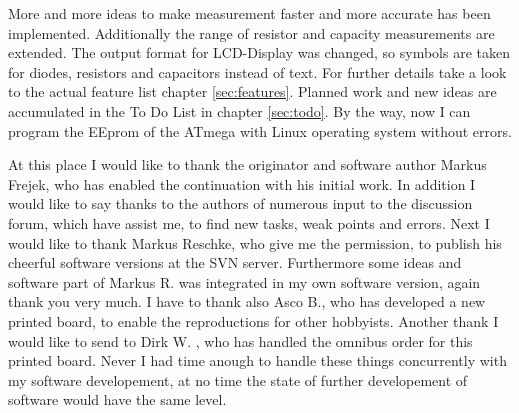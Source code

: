 More and more ideas to make measurement faster and more accurate has been implemented.
Additionally the range of resistor and capacity measurements are extended.
The output format for LCD-Display was changed, so symbols are taken for diodes, resistors and capacitors instead of text.
For further details take a look to the actual feature list chapter \ref{sec:features}.
Planned work and new ideas are accumulated in the To Do List in chapter \ref{sec:todo}.
By the way, now I can program the EEprom of the ATmega with Linux operating system without errors.

At this place I would like to thank the originator and software author Markus Frejek, who has enabled the continuation
with his initial work.
In addition I would like to say thanks to the authors of numerous input to the discussion forum, which have assist me, to
find new tasks, weak points and errors.
Next I would like to thank Markus Reschke, who give me the permission, to publish his cheerful software versions at the
SVN server. Furthermore some ideas and software part of Markus R. was integrated in my own software version,
again thank you very much.
I have to thank also Asco B., who has developed a new printed board, to enable the reproductions for other hobbyists.
Another thank I would like to send to Dirk W. , who has handled the omnibus order for this printed board.
Never I had time anough to handle these things concurrently with my software developement, at no time the state of further
developement of software would have the same level.

